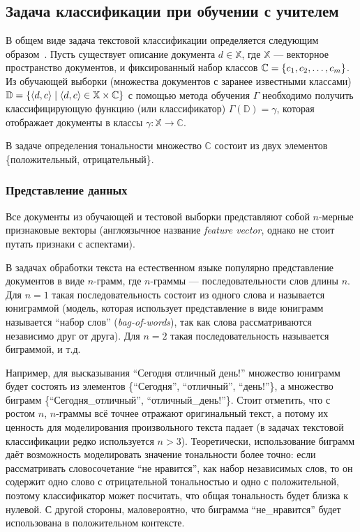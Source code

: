 \subsection{Задача классификации при обучении с учителем}

В общем виде задача текстовой классификации определяется следующим 
образом~\cite{stanford_ir}. 
Пусть существует описание документа $d \in \mathbb{X}$, где $\mathbb{X}$ --- векторное пространство документов, и фиксированный набор классов 
$\mathbb{C} = \left \{ c_1, c_2, \ldots, c_m \right \}$. 
Из обучающей выборки (множества документов с заранее известными классами)
$\mathbb{D} = \{\left \langle d, c \right \rangle  \mid \left \langle d, c \right \rangle  \in \mathbb{X} \times \mathbb{C}\}$
с помощью метода обучения $\Gamma$ необходимо получить классифицирующую 
функцию (или классификатор) 
$\Gamma(\mathbb{D}) = \gamma$, которая отображает документы в классы $\gamma: \mathbb{X} \rightarrow \mathbb{C}$.

В задаче определения тональности множество $\mathbb{C}$ состоит 
из двух элементов \{положительный, отрицательный\}.

\subsubsection{Представление данных}
Все документы из обучающей и тестовой выборки представляют собой $n$-мерные признаковые векторы 
(англоязычное название \textit{feature vector}, однако не стоит путать признаки с аспектами). 

В задачах обработки текста на естественном языке популярно представление 
документов в виде $n$-грамм, где $n$-граммы --- последовательности слов длины $n$. 
Для $n = 1$ такая последовательность состоит из одного слова и называется 
юниграммой (модель, которая использует представление в виде юниграмм 
называется ``набор слов'' (\textit{bag-of-words}), так как слова рассматриваются 
независимо друг от друга). Для $n = 2$ такая последовательность называется биграммой, и т.д.

Например, для высказывания ``Сегодня отличный день!'' множество юниграмм 
будет состоять из элементов \{``Сегодня'', ``отличный'', ``день!''\}, а множество
биграмм \{``Сегодня\_отличный'', ``отличный\_день!''\}. 
Стоит отметить, что с ростом $n$, $n$-граммы всё точнее 
отражают оригинальный текст, а потому их ценность
для моделирования произвольного текста падает (в задачах текстовой 
классификации редко используется $n > 3$). Теоретически, использование биграмм
даёт возможность моделировать значение тональности более точно: если 
рассматривать словосочетание ``не нравится'', как набор независимых слов, то
он содержит одно слово с отрицательной тональностью
и одно с положительной, поэтому
классификатор может посчитать, что общая тональность будет близка к нулевой. С 
другой стороны, маловероятно, что биграмма ``не\_нравится'' 
будет использована в положительном контексте.

